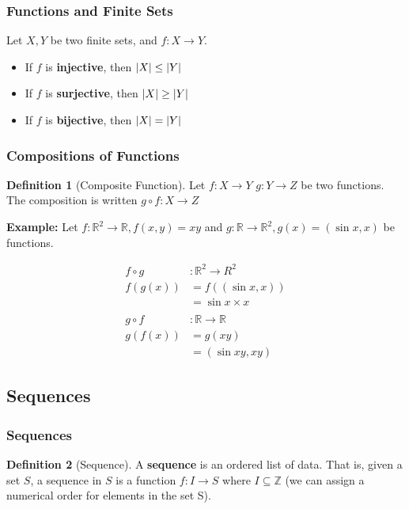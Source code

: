 \documentclass[12pt]{article}
\DeclarePairedDelimiter\abs{\lvert}{\rvert}
\newcommand{\Z}{\mathbb{Z}}
\newcommand{\R}{\mathbb{R}}
\theoremstyle{definition}
\newtheorem{definition}{Definition}
\begin{document}
    \subsubsection{Functions and Finite Sets}
    Let $X, Y$ be two finite sets, and $f: X \to Y$.
    \begin{itemize}
        \item If $f$ is \textbf{injective}, then $\abs{X} \le \abs{Y}$
        \item If $f$ is \textbf{surjective}, then $\abs{X} \ge \abs{Y}$
        \item If $f$ is \textbf{bijective}, then $\abs{X} = \abs{Y}$
    \end{itemize}

    \subsubsection{Compositions of Functions}
    \begin{definition}[Composite Function]
        \label{def:composite-function}
        Let $f:X \to Y$ $g: Y \to Z$ be two functions. The composition is written
        $g \circ f: X \to Z$
    \end{definition}
    \textbf{Example:} Let $f:\R^2 \to \R, f(x,y) = xy$ 
    and $g:\R \to \R^2, g(x) = (\sin{x}, x)$ be functions.

    \begin{equation*}
        \begin{aligned}
            f \circ g &: \R^2 \to R^2 \\
            f(g(x)) &= f((\sin{x}, x))\\
            &= \sin{x} \times x \\\\
            g \circ f &: \R \to \R \\
            g(f(x)) &= g(xy)\\
            &= (\sin{xy}, xy)
        \end{aligned}
    \end{equation*}

    \subsection{Sequences}
    \subsubsection{Sequences}
    \begin{definition}[Sequence]
        \label{def:sequence}
        A \textbf{sequence} is an ordered list of data. That is, given a set $S$,
        a sequence in $S$ is a function $f: I \to S$ where $I \subseteq \Z$ (we can assign
        a numerical order for elements in the set S).
    \end{definition}
\end{document}
